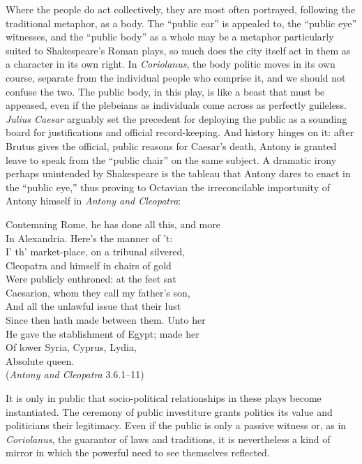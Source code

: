 Where the people do act collectively, they are most often portrayed, following the traditional metaphor, as a body.
The ``public ear'' is appealed to, the ``public eye'' witnesses, and the ``public body'' as a whole may be a metaphor particularly suited to Shakespeare's Roman plays, so much does the city itself act in them as a character in its own right.
In \emph{Coriolanus}, the body politic moves in its own course, separate from the individual people who comprise it, and we should not confuse the two.
The public body, in this play, is like a beast that must be appeased, even if the plebeians as individuals come across as perfectly guileless.
\emph{Julius Caesar} arguably set the precedent for deploying the public as a sounding board for justifications and official record-keeping.
And history hinges on it: after Brutus gives the official, public reasons for Caesar's death, Antony is granted leave to speak from the ``public chair'' on the same subject.
A dramatic irony perhaps unintended by Shakespeare is the tableau that Antony dares to enact in the ``public eye,'' thus proving to Octavian the irreconcilable importunity of Antony himself in \emph{Antony and Cleopatra}:
\begin{vq}
Contemning Rome, he has done all this, and more\\
In Alexandria. Here's the manner of 't:\\
I' th' market-place, on a tribunal silvered,\\ 
Cleopatra and himself in chairs of gold\\
Were publicly enthroned: at the feet sat\\
Caesarion, whom they call my father's son,\\
And all the unlawful issue that their lust\\
Since then hath made between them. Unto her\\
He gave the stablishment of Egypt; made her \\
Of lower Syria, Cyprus, Lydia,\\
Absolute queen.\\
\hfill(\emph{Antony and Cleopatra} 3.6.1--11)
\end{vq}
It is only in public that socio-political relationships in these plays become instantiated.
The ceremony of public investiture grants politics its value and politicians their legitimacy.
Even if the public is only a passive witness or, as in \emph{Coriolanus}, the guarantor of laws and traditions, it is nevertheless a kind of mirror in which the powerful need to see themselves reflected.
